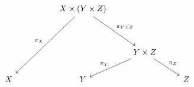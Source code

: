 \[\begin{tikzcd}
	&& {X \times (Y \times Z)} \\
	\\
	&&& {Y \times Z} \\
	X && Y && Z
	\arrow["{\pi_{X}}"', from=1-3, to=4-1]
	\arrow["{\pi_{Y \times Z}}", from=1-3, to=3-4]
	\arrow["{\pi_{Y}}"', from=3-4, to=4-3]
	\arrow["{\pi_{Z}}", from=3-4, to=4-5]
\end{tikzcd}\]
